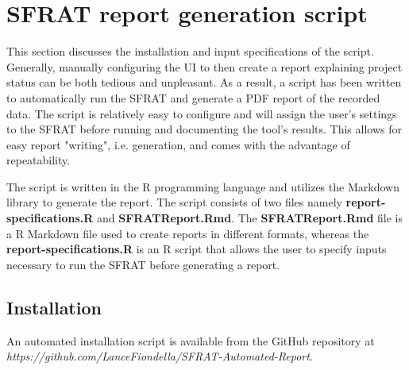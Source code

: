 \documentclass[conference]{IEEEtran}
\begin{document}
\section{SFRAT report generation script}\label{sec:Script}
This section discusses the installation and input specifications of the script.
Generally, manually configuring the UI to then create a report explaining project status can be both tedious and unpleasant. As a result, a script has been written to automatically run the SFRAT and generate a PDF report of the recorded data. The script is relatively easy to configure and will assign the user's settings to the SFRAT before running and documenting the tool's results. This allows for easy report "writing", i.e. generation, and comes with the advantage of repeatability.

The script is written in the R programming language and utilizes the Markdown library to generate the report. The script consists of two files namely \textbf{report-specifications.R} and \textbf{SFRATReport.Rmd}. The \textbf{SFRATReport.Rmd} file is a R Markdown file used to create reports in different formats, whereas the \textbf{report-specifications.R} is an R script that allows the user to specify inputs necessary to run the SFRAT before generating a report.

\subsection{Installation}\label{sec:ScriptInstall}
An automated installation script is available from the GitHub repository at \textit{https://github.com/LanceFiondella/SFRAT-Automated-Report}.
\end{document}
